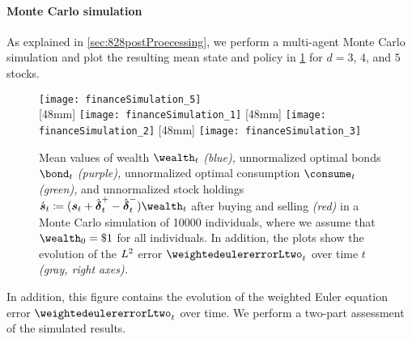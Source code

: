 \paragraph{Monte Carlo simulation}

As explained in \cref{sec:828postProecessing},
we perform a multi-agent Monte Carlo simulation
and plot the resulting mean state and policy in \cref{fig:financeSimulation}
for $d = 3$, $4$, and $5$ stocks.
\begin{figure}
  \texttt{[image: financeSimulation\_5]}%
  \\[2mm]%
  [48mm]{%
    \texttt{[image: financeSimulation\_1]}%
  }%
  \hfill%
  [48mm]{%
    \texttt{[image: financeSimulation\_2]}%
  }%
  \hfill%
  [48mm]{%
    \texttt{[image: financeSimulation\_3]}%
  }%
    \caption[Monte Carlo simulation of the TCP]{%
      Mean values of
      wealth $\wealth_t$
      \emph{\textcolor{C0}{(blue)},}
      unnormalized optimal bonds $\bond_t$
      \emph{\textcolor{C3}{(purple)},}
      unnormalized optimal consumption $\consume_t$
      \emph{\textcolor{C4}{(green)},} and
      unnormalized stock holdings
      $
        \acute{\vstock}_t
        \ceq (\vstock_t + \vnormbuy_t - \vnormsell_t) \wealth_t
      $
      after buying and selling
      \emph{\textcolor{C1}{(red)}}
      \vspace{0.1em}%
      in a Monte Carlo simulation of \num{10000} individuals,
      \vspace{-0.1em}%
      where we assume that $\wealth_0 = \$1$ for all individuals.
      In addition, the plots show the evolution of the
      $L^2$ error $\weightedeulererrorLtwo_t$ over time $t$
      \emph{\textcolor{C8}{(gray, right axes)}.}%
    }%
    \label{fig:financeSimulation}%
\end{figure}%
In addition, this figure contains the evolution of the
weighted Euler equation error $\weightedeulererrorLtwo_t$ over time.
We perform a two-part assessment of the simulated results.
